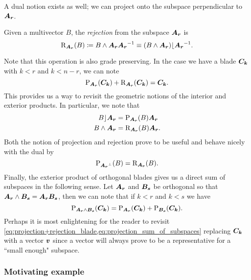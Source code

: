 A dual notion exists as well; we can project onto the subspace perpendicular to $\boldsymbol{A_r}$.
\begin{definition}
Given a multivector $B$, the \emph{rejection} from the subspace $\boldsymbol{A_r}$ is
\begin{equation}
\label{eq:rejection}
\operatorname{R}_{\boldsymbol{A_r}}(B) \coloneqq B \wedge \boldsymbol{A_r} \boldsymbol{A_r}^{-1} \equiv (B\wedge \boldsymbol{A_r})\lfloor \boldsymbol{A_r}^{-1}.
\end{equation}
\end{definition}
Note that this operation is also grade preserving. In the case we have a blade $\boldsymbol{C_k}$ with $k<r$ and $k<n-r$, we can note
\begin{equation}
\label{eq:projection+rejection_blade}
\operatorname{P}_{\boldsymbol{A_r}}(\boldsymbol{C_k}) + \operatorname{R}_{\boldsymbol{A_r}}(\boldsymbol{C_k}) = \boldsymbol{C_k}.
\end{equation}
This provides us a way to revisit the geometric notions of the interior and exterior products. In particular, we note that
\begin{align}
    B \rfloor \boldsymbol{A_r} &= \operatorname{P}_{\boldsymbol{A_r}} (B) \boldsymbol{A_r}\\
    B \wedge \boldsymbol{A_r} &= \operatorname{R}_{\boldsymbol{A_r}}(B) \boldsymbol{A_r}.
\end{align}
Both the notion of projection and rejection prove to be useful and behave nicely with the dual by
\begin{equation}
\label{eq:projection_rejection_duality}
\operatorname{P}_{\boldsymbol{A_r}^\perp}(B) = \operatorname{R}_{\boldsymbol{A_r}}(B).
\end{equation}
Finally, the exterior product of orthogonal blades gives us a direct sum of subspaces in the following sense. Let $\boldsymbol{A_r}$ and $\boldsymbol{B_s}$ be orthogonal so that $\boldsymbol{A_r}\wedge \boldsymbol{B_s}=\boldsymbol{A_r}\boldsymbol{B_s}$, then we can note that if $k<r$ and $k<s$ we have
\begin{equation}
\label{eq:projection_sum_of_subspaces}
    \operatorname{P}_{\boldsymbol{A_r}\wedge \boldsymbol{B_s}} (\boldsymbol{C_k}) = \operatorname{P}_{\boldsymbol{A_r}}(\boldsymbol{C_k}) + \operatorname{P}_{\boldsymbol{B_s}}(\boldsymbol{C_k}).
\end{equation}
Perhaps it is most enlightening for the reader to revisit \cref{eq:projection+rejection_blade,eq:projection_sum_of_subspaces} replacing $\boldsymbol{C_k}$ with a vector $\boldsymbol{v}$ since a vector will always prove to be a representative for a ``small enough" subspace.


\subsubsection{Motivating example}
\label{subsubsec:motivating_example}

